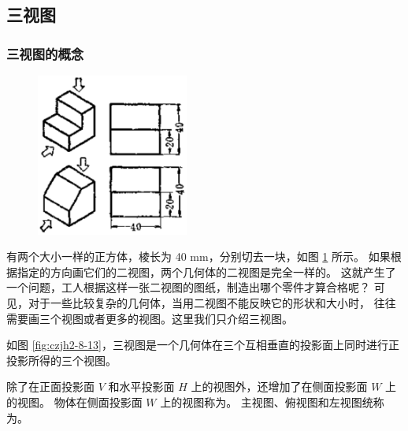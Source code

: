 \subsection{三视图}\label{subsec:czjh2-8-3}

\subsubsection{三视图的概念}

\begin{figure}
    \centering
    \includegraphics[width=5cm]{../pic/czjh2-ch8-12.png}
    \caption{}\label{fig:czjh2-8-12}
\end{figure}

有两个大小一样的正方体，棱长为 40 mm，分别切去一块，如图 \ref{fig:czjh2-8-12} 所示。
如果根据指定的方向画它们的二视图，两个几何体的二视图是完全一样的。
这就产生了一个问题，工人根据这样一张二视图的图纸，制造出哪个零件才算合格呢？
可见，对于一些比较复杂的几何体，当用二视图不能反映它的形状和大小时，
往往需要画三个视图或者更多的视图。这里我们只介绍三视图。

如图 \ref{fig:czjh2-8-13}，三视图是一个几何体在三个互相垂直的投影面上同时进行正投影所得的三个视图。

除了在正面投影面 $V$ 和水平投影面 $H$ 上的视图外，还增加了在侧面投影面 $W$ 上的视图。
物体在侧面投影面 $W$ 上的视图称为。
主视图、俯视图和左视图统称为。

